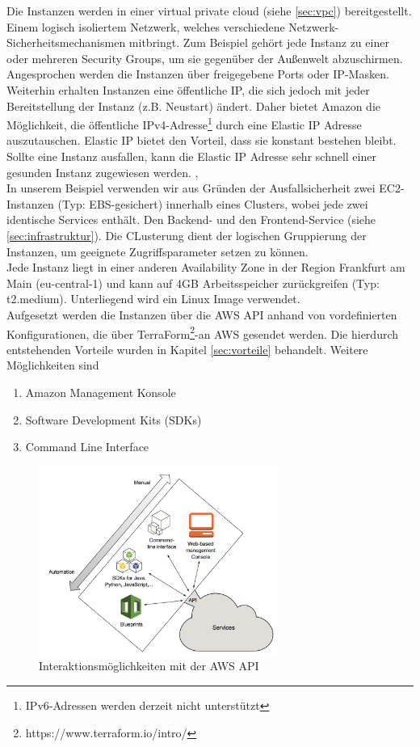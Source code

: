Die Instanzen werden in einer virtual private cloud (siehe \ref{sec:vpc}) bereitgestellt. Einem logisch isoliertem Netzwerk, welches verschiedene Netzwerk-Sicherheitsmechanismen mitbringt. Zum Beispiel gehört jede Instanz zu einer oder mehreren Security Groups, um sie gegenüber der Außenwelt abzuschirmen. Angesprochen werden die Instanzen über freigegebene Ports oder IP-Masken. \\
Weiterhin erhalten Instanzen eine öffentliche IP, die sich jedoch mit jeder Bereitstellung der Instanz (z.B. Neustart) ändert. Daher bietet Amazon die Möglichkeit, die öffentliche IPv4-Adresse\footnote{IPv6-Adressen werden derzeit nicht unterstützt} durch eine Elastic IP Adresse auszutauschen. Elastic IP bietet den Vorteil, dass sie konstant bestehen bleibt. Sollte eine Instanz ausfallen, kann die Elastic IP Adresse sehr schnell einer gesunden Instanz zugewiesen werden.
\cite{vliet:resilience}, \cite{aws:eip} \\

In unserem Beispiel verwenden wir aus Gründen der Ausfallsicherheit zwei EC2-Instanzen (Typ: EBS-gesichert) innerhalb eines Clusters, wobei jede zwei identische Services enthält. Den Backend- und den Frontend-Service (siehe \ref{sec:infrastruktur}). Die CLusterung dient der logischen Gruppierung der Instanzen, um geeignete Zugriffsparameter setzen zu können. \\
Jede Instanz liegt in einer anderen Availability Zone in der Region Frankfurt am Main (eu-central-1) und kann auf 4GB Arbeitsspeicher zurückgreifen (Typ: t2.medium). Unterliegend wird ein Linux Image verwendet. \\
Aufgesetzt werden die Instanzen über die AWS API anhand von vordefinierten Konfigurationen, die über TerraForm\footnote{https://www.terraform.io/intro/}-an AWS gesendet werden. Die hierdurch entstehenden Vorteile wurden in Kapitel \ref{sec:vorteile} behandelt. Weitere Möglichkeiten sind
\begin{enumerate}
  \item Amazon Management Konsole
  \item Software Development Kits (SDKs)
  \item Command Line Interface
\end{enumerate} \cite{wittig:awsinaction}

\begin{figure}[!ht]
  \centering
  \includegraphics[width=0.7\textwidth]{images/awsapi.png}
  \caption{Interaktionsmöglichkeiten mit der AWS API \cite{wittig:awsinaction}}
\end{figure}

